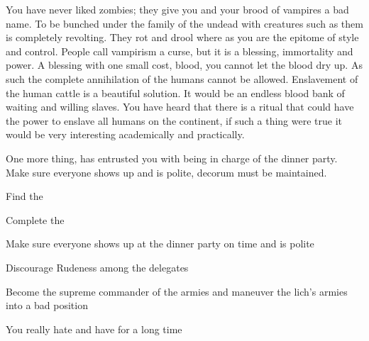 \documentclass[char]{guildcamp2}
\begin{document}
You have never liked zombies; they give you and your brood of vampires a bad name. To be bunched under the family of the undead with creatures such as them is completely revolting. They rot and drool where as you are the epitome of style and control. People call vampirism a curse, but it is a blessing, immortality and power. A blessing with one small cost, blood, you cannot let the blood dry up. As such the complete annihilation of the humans cannot be allowed. Enslavement of the human cattle is a beautiful solution. It would be an endless blood bank of waiting and willing slaves. You have heard that there is a ritual that could have the power to enslave all humans on the continent, if such a thing were true it would be very interesting academically and practically. 

One more thing, \cOnyx{} has entrusted you with being in charge of the dinner party. Make sure everyone shows up and is polite, decorum must be maintained.   


\begin{itemz}[Goals]
  \item Find the \iDaywalkerFruit{}
  \item Complete the \gEnslaveRitual{}
  \item Make sure everyone shows up at the dinner party on time and is polite
	\item Discourage Rudeness among the delegates
	\item Become the supreme commander of the armies and maneuver the lich's armies into a bad position
\end{itemz}

\begin{itemz}[Notes]
  \item  
\end{itemz}


\begin{contacts}
  \contact{\cLich{}} You really hate \cLich{\them} and have for a long time
\end{contacts}


\end{document}
